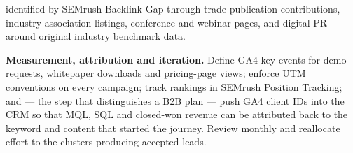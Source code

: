 \begin{qlist}
\begin{apts}
      identified by SEMrush Backlink Gap through trade-publication
      contributions, industry association listings, conference and webinar
      pages, and digital PR around original industry benchmark data.
\item \textbf{Measurement, attribution and iteration.} Define GA4 key events
      for demo requests, whitepaper downloads and pricing-page views; enforce
      UTM conventions on every campaign; track rankings in SEMrush Position
      Tracking; and --- the step that distinguishes a B2B plan --- push GA4
      client IDs into the CRM so that MQL, SQL and closed-won revenue can be
      attributed back to the keyword and content that started the journey.
      Review monthly and reallocate effort to the clusters producing accepted
      leads.
\end{apts}


\end{qlist}
